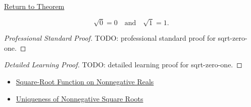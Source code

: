 \newpage
{}
\label{prf:sqrt-zero-one}

\begin{remark*}[Return]
\hyperref[thm:sqrt-zero-one]{Return to Theorem}
\end{remark*}

\begin{theorem*}
\[
\sqrt{0}=0
\quad\text{and}\quad
\sqrt{1}=1.
\]
\end{theorem*}

\begin{proof}[Professional Standard Proof]
\LRAProofBodyStart
TODO: professional standard proof for sqrt-zero-one.
\end{proof}

\begin{proof}[Detailed Learning Proof]
\LRAProofBodyStart
TODO: detailed learning proof for sqrt-zero-one.
\end{proof}

\begin{remark*}
\end{remark*}

\begin{dependencies}
\begin{itemize}
  \item \hyperref[def:real-square-root-function]{Square-Root Function on Nonnegative Reals}
  \item \hyperref[thm:uniqueness-of-nonnegative-square-roots]{Uniqueness of Nonnegative Square Roots}
\end{itemize}
\end{dependencies}

\clearpage
